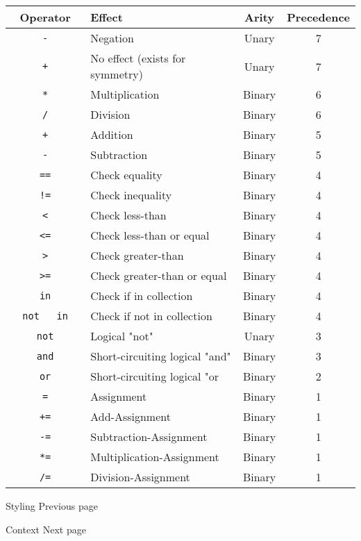 \begin{longtable}[]{@{}clcc@{}}
\toprule\noalign{}
Operator & Effect & Arity & Precedence \\
\midrule\noalign{}
\endhead
\bottomrule\noalign{}
\endlastfoot
\texttt{\ }{\texttt{\ -\ }}\texttt{\ } & Negation & Unary & 7 \\
\texttt{\ }{\texttt{\ +\ }}\texttt{\ } & No effect (exists for symmetry)
& Unary & 7 \\
\texttt{\ *\ } & Multiplication & Binary & 6 \\
\texttt{\ /\ } & Division & Binary & 6 \\
\texttt{\ }{\texttt{\ +\ }}\texttt{\ } & Addition & Binary & 5 \\
\texttt{\ }{\texttt{\ -\ }}\texttt{\ } & Subtraction & Binary & 5 \\
\texttt{\ ==\ } & Check equality & Binary & 4 \\
\texttt{\ !=\ } & Check inequality & Binary & 4 \\
\texttt{\ \textless{}\ } & Check less-than & Binary & 4 \\
\texttt{\ \textless{}=\ } & Check less-than or equal & Binary & 4 \\
\texttt{\ \textgreater{}\ } & Check greater-than & Binary & 4 \\
\texttt{\ \textgreater{}=\ } & Check greater-than or equal & Binary &
4 \\
\texttt{\ in\ } & Check if in collection & Binary & 4 \\
\texttt{\ }{\texttt{\ not\ }}\texttt{\ }{\texttt{\ in\ }}\texttt{\ } &
Check if not in collection & Binary & 4 \\
\texttt{\ }{\texttt{\ not\ }}\texttt{\ } & Logical "not" & Unary & 3 \\
\texttt{\ and\ } & Short-circuiting logical "and" & Binary & 3 \\
\texttt{\ or\ } & Short-circuiting logical "or & Binary & 2 \\
\texttt{\ =\ } & Assignment & Binary & 1 \\
\texttt{\ +=\ } & Add-Assignment & Binary & 1 \\
\texttt{\ -=\ } & Subtraction-Assignment & Binary & 1 \\
\texttt{\ *=\ } & Multiplication-Assignment & Binary & 1 \\
\texttt{\ /=\ } & Division-Assignment & Binary & 1 \\
\end{longtable}

\href{/docs/reference/styling/}{\pandocbounded{}}

{ Styling } { Previous page }

\href{/docs/reference/context/}{\pandocbounded{}}

{ Context } { Next page }
